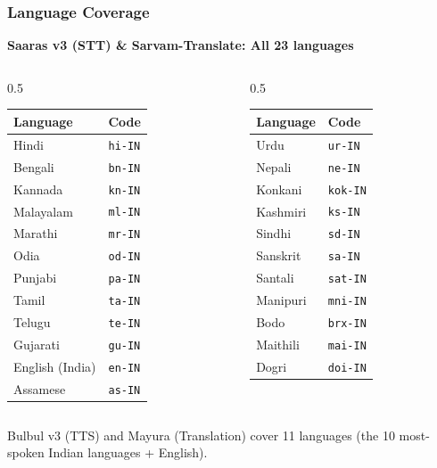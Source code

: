 \begin{frame}[fragile]\frametitle{Language Coverage}
\textbf{Saaras v3 (STT) \& Sarvam-Translate: All 23 languages}

\begin{columns}
    \begin{column}[T]{0.5\linewidth}
\begin{tabular}{ll}
\textbf{Language} & \textbf{Code} \\
\hline
Hindi & \texttt{hi-IN} \\
Bengali & \texttt{bn-IN} \\
Kannada & \texttt{kn-IN} \\
Malayalam & \texttt{ml-IN} \\
Marathi & \texttt{mr-IN} \\
Odia & \texttt{od-IN} \\
Punjabi & \texttt{pa-IN} \\
Tamil & \texttt{ta-IN} \\
Telugu & \texttt{te-IN} \\
Gujarati & \texttt{gu-IN} \\
English (India) & \texttt{en-IN} \\
Assamese & \texttt{as-IN} \\
\end{tabular}
    \end{column}
    \begin{column}[T]{0.5\linewidth}
\begin{tabular}{ll}
\textbf{Language} & \textbf{Code} \\
\hline
Urdu & \texttt{ur-IN} \\
Nepali & \texttt{ne-IN} \\
Konkani & \texttt{kok-IN} \\
Kashmiri & \texttt{ks-IN} \\
Sindhi & \texttt{sd-IN} \\
Sanskrit & \texttt{sa-IN} \\
Santali & \texttt{sat-IN} \\
Manipuri & \texttt{mni-IN} \\
Bodo & \texttt{brx-IN} \\
Maithili & \texttt{mai-IN} \\
Dogri & \texttt{doi-IN} \\
\end{tabular}
    \end{column}
\end{columns}

\vspace{0.3em}
{\small Bulbul v3 (TTS) and Mayura (Translation) cover 11 languages (the 10 most-spoken Indian languages + English).}
\end{frame}

